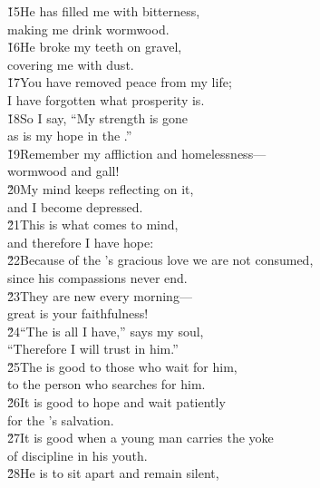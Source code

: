 \begin{poetry}
\poeml \v{15}He has filled me with bitterness, \\
\poemll    making me drink wormwood. \\
\poeml \v{16}He broke my teeth on gravel, \\
\poemll    covering me with dust. \\
\poeml \v{17}You have removed peace from my life; \\
\poemll    I have forgotten what prosperity is. \\
\poeml \v{18}So I say, ``My strength is gone \\
\poemll    as is my hope in the .'' \\
\poeml \v{19}Remember my affliction and homelessness--- \\
\poemll    wormwood and gall! \\
\poeml \v{20}My mind keeps reflecting on it, \\
\poemll    and I become depressed. \\
\poeml \v{21}This is what comes to mind, \\
\poemll    and therefore I have hope: \\
\poeml \v{22}Because of the 's gracious love we are not consumed, \\
\poemll    since his compassions never end. \\
\poeml \v{23}They are new every morning--- \\
\poemll    great is your faithfulness! \\
\poeml \v{24}``The  is all I have,'' says my soul, \\
\poemll    ``Therefore I will trust in him.'' \\
\poeml \v{25}The  is good to those who wait for him, \\
\poemll    to the person who searches for him. \\
\poeml \v{26}It is good to hope and wait patiently \\
\poemll    for the 's salvation. \\
\poeml \v{27}It is good when a young man carries the yoke \\
\poemll    of discipline in his youth. \\
\poeml \v{28}He is to sit apart and remain silent, \\

\end{poetry}
